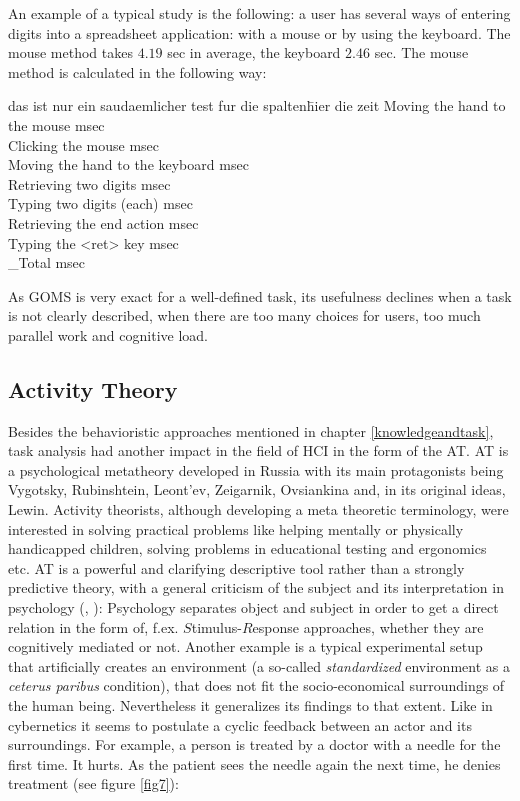 An example of a typical study is the following: a user has several ways of entering digits into a spreadsheet application: with a mouse or by using the keyboard. The mouse method takes $4.19$ sec in average, the keyboard $2.46$ sec. The mouse method is calculated in the following way:

\begin{tabbing}
das ist nur ein saudaemlicher test fur die spalten\=  hier die zeit\kill
Moving the hand to the mouse  msec\\
Clicking the mouse  msec\\
Moving the hand to the keyboard  msec\\
Retrieving two digits  msec\\
Typing two digits (each) msec\\
Retrieving the end action  msec\\
Typing the <ret> key  msec\\
\_Total  msec
\end{tabbing}

As \ac{GOMS} is very exact for a well-defined task, its usefulness declines when a task is not clearly described, when there are too many choices for users, too much parallel work and cognitive load. 

\subsection{Activity Theory}
Besides the behavioristic approaches mentioned in chapter \ref{knowledgeandtask}, task analysis had another impact in the field of \ac{HCI} in the form of the \ac{AT}. \acs{AT} is a psychological metatheory developed in Russia with its main protagonists being Vygotsky, Rubinshtein, Leont'ev, Zeigarnik, Ovsiankina  and, in its original ideas, Lewin. Activity theorists, although developing a meta theoretic terminology, were interested in solving practical problems like helping mentally or physically handicapped children, solving problems in educational testing and ergonomics etc. \ac{AT} is a powerful and clarifying descriptive tool rather than a strongly predictive theory, with a general criticism of the subject and its interpretation in psychology (\cite{nardi1996activity}, \cite{leont1974problem}): Psychology separates object and subject in order to get a direct relation in the form of, f.ex. $S$timulus-$R$esponse approaches, whether they are cognitively mediated or not. Another example is a typical experimental setup that artificially creates an environment (a so-called \textit{standardized} environment as a \textit{ceterus paribus} condition), that does not fit the socio-economical surroundings of the human being. Nevertheless it generalizes its findings to that extent. Like in cybernetics it seems to postulate a cyclic feedback between an actor and its surroundings. For example, a person is treated by a doctor with a needle for the first time. It hurts. As the patient sees the needle again the next time, he denies treatment (see figure \ref{fig7}): 

